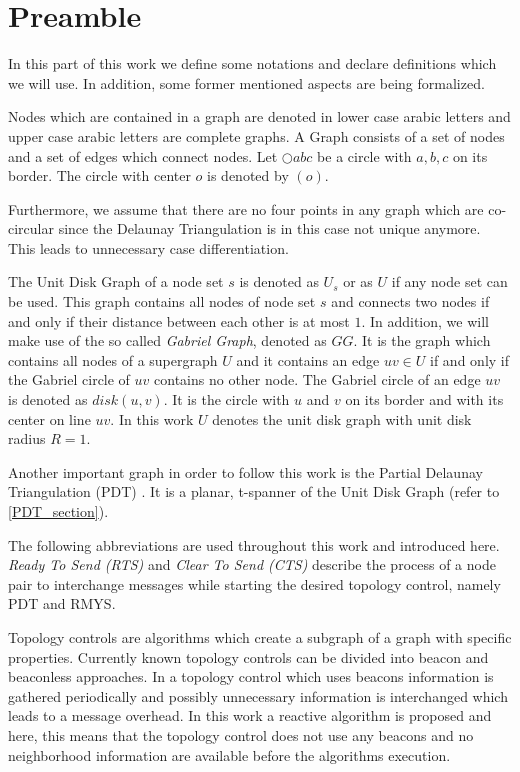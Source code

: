 \section{Preamble}
In this part of this work we define some notations and declare definitions which we will use.
In addition, some former mentioned aspects are being formalized.

Nodes which are contained in a graph are denoted in lower case arabic letters and upper case arabic letters are complete graphs.
A Graph consists of a set of nodes and a set of edges which connect nodes.
Let $\bigcirc{abc} $ be a circle with $a, b, c $ on its border.
The circle with center $o $ is denoted by $(o) $.

Furthermore, we assume that there are no four points in any graph which are co-circular since the Delaunay Triangulation is in this case not unique anymore.
This leads to unnecessary case differentiation.

The Unit Disk Graph of a node set $s $ is denoted as $U_s $ or as $U $ if any node set can be used.
This graph contains all nodes of node set $s $ and connects two nodes if and only if their distance between each other is at most $1 $.
In addition, we will make use of the so called \emph{Gabriel Graph}, denoted as $GG $. 
It is the graph which contains all nodes of a supergraph $U $ and it contains an edge $uv \in U $ if and only if the Gabriel circle of $uv $ contains no other node.
The Gabriel circle of an edge $uv $ is denoted as $disk(u, v) $.
It is the circle with $u $ and $v $ on its border and with its center on line $uv $. 
In this work $U $ denotes the unit disk graph with unit disk radius $R = 1 $.

Another important graph in order to follow this work is the Partial Delaunay Triangulation (PDT)  \cite{pdt}. It is a planar, t-spanner of the Unit Disk Graph (refer to \ref{PDT_section}).

The following abbreviations are used throughout this work and introduced here.
\emph{Ready To Send (RTS)} and \emph{Clear To Send (CTS)} describe the process of a node pair to interchange messages while starting the desired topology control, namely PDT and RMYS.

Topology controls are algorithms which create a subgraph of a graph with specific properties.
Currently known topology controls can be divided into beacon and beaconless approaches.
In a topology control which uses beacons information is gathered periodically and possibly unnecessary information is interchanged which leads to a message overhead.
In this work a reactive algorithm is proposed and here, this means that the topology control does not use any beacons and no neighborhood information are available before the algorithms execution.




